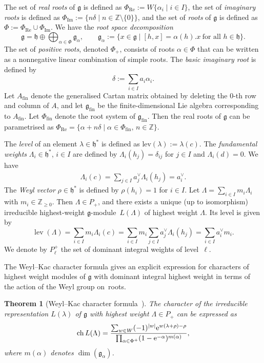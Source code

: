 \documentclass[pdftex]{sigma}
\numberwithin{equation}{section}
\newtheorem{Theorem}{Theorem}[section]
\theoremstyle{definition}
\begin{document}
The set of \emph{real roots} of $\mathfrak{g}$ is defined as $\Phi_{\mathrm{Re}}:= W\{\alpha_i \mid i\in I\}$, the set of \emph{imaginary roots} is defined as $\Phi_{\mathrm{Im}}:=\{n\delta \mid n\in\mathbb Z\setminus\{0\}\}$, and the set of \emph{roots} of $\mathfrak{g}$ is defined as $\Phi:=\Phi_{\mathrm{Re}}\cup\Phi_{\mathrm{Im}}$. We have the \emph{root space decomposition}
\[
\mathfrak{g} = \mathfrak{h}  \oplus  \bigoplus_{\alpha \in \Phi} \mathfrak{g}_{\alpha},
\qquad
\mathfrak{g}_{\alpha} := \{ x \in \mathfrak{g} \mid [h,x] = \alpha(h).x \ \text{for all } h \in \mathfrak{h} \}.
\]
The set of \emph{positive roots}, denoted $\Phi_+$, consists of roots $\alpha\in\Phi$ that can be written as a nonnegative linear combination of simple roots. The \emph{basic imaginary root} is defined by
\[
\delta:=\sum_{i\in I} a_i \alpha_i.
\]
Let $A_{\mathrm{fin}}$ denote the generalised Cartan matrix obtained by deleting the $0$-th row and column of $A$, and let $\mathfrak{g}_{\mathrm{fin}}$ be the finite-dimensional Lie algebra corresponding to $A_{\mathrm{fin}}$.
Let $\Phi_{\mathrm{fin}}$ denote the root system of $\mathfrak{g}_{\mathrm{fin}}$. Then the real roots of $\mathfrak g$ can be parametrised as $\Phi_{\mathrm{Re}}
 = \{ \alpha + n\delta \mid \alpha\in \Phi_{\mathrm{fin}},\, n\in\mathbb Z \}$.

 The \emph{level} of an element $\lambda \in \mathfrak{h}^*$ is defined as $\mathrm{lev}(\lambda) := \lambda(c)$. The \emph{fundamental weights} $\Lambda_i\in\mathfrak h^{*}$, $i\in I$ are defined by $\Lambda_i(h_j)=\delta_{ij}$ for $j\in I$ and $\Lambda_i(d)=0$. We have
 \begin{align*}
 \Lambda_i(c)=\sum_{j\in I}a_j^\vee\Lambda_i(h_j)=a_i^\vee.
 \end{align*}
 The \emph{Weyl vector} $\rho\in\mathfrak h^{*}$ is defined by $\rho(h_i)=1$ for $i\in I$. Let $\Lambda=\sum_{i\in I} m_i\Lambda_i$ with ${m_i\in\mathbb Z_{\ge0}}$.
Then $\Lambda\in P_{+}$, and there exists a unique (up to isomorphism) irreducible highest-weight
$\mathfrak g$\nobreakdash-module~$L(\Lambda)$ of highest weight $\Lambda$. Its level is given by
\[
\operatorname{lev}(\Lambda)=\sum_{i\in I} m_i\Lambda_i(c)=\sum_{i\in I}m_i\sum_{j\in I}a_j^\vee\Lambda_i(h_j)=\sum_{i\in I}a_i^\vee m_i.
\]
We denote by $P_\ell^+$ the set of dominant integral weights of level~$\ell$.

The Weyl--Kac character formula gives an explicit expression for characters of highest weight modules of $\mathfrak{g}$ with dominant integral highest weight in terms of the action of the Weyl group on~roots.
\begin{Theorem}[{Weyl--Kac character formula~\cite[Theorem~10.4]{Kac90}}]
The character of the irreducible representation $L(\lambda)$ of $\mathfrak{g}$ with highest weight $ \Lambda \in P_+$ can be expressed as
\begin{align*}
\operatorname{ch}L(\Lambda) = \frac{\sum_{w \in W} (-1)^{|w|} {\rm e}^{w(\lambda + \rho) - \rho}}{\prod_{\alpha \in \Phi^+} (1 - {\rm e}^{-\alpha})^{m(\alpha)}},
\end{align*}
where $m(\alpha)$ denotes $\dim (\mathfrak{g}_{\alpha})$.
\end{Theorem}
\end{document}
